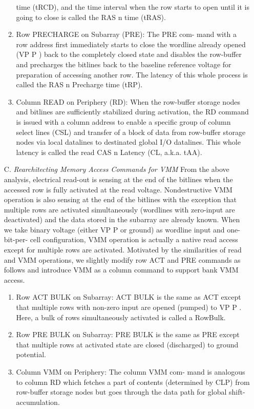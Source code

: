 \documentclass{article}
\begin{document}
\begin{itemize}
\begin{enumerate}
 					time (tRCD), and the time interval when the row starts to open
 					until it is going to close is called the RAS n time (tRAS).
 					\item Row PRECHARGE on Subarray (PRE): The PRE com-
 					mand with a row address first immediately starts to close
 					the wordline already opened (VP P ) back to the completely
 					closed state and disables the row-buffer and precharges the
 					bitlines back to the baseline reference voltage for preparation
 					of accessing another row. The latency of this whole process
 					is called the RAS n Precharge time (tRP).
 					\item Column READ on Periphery (RD): When the row-buffer
 					storage nodes and bitlines are sufficiently stabilized during
 					activation, the RD command is issued with a column address
 					to enable a specific group of column select lines (CSL) and
 					transfer of a block of data from row-buffer storage nodes via
 					local datalines to destinated global I/O datalines. This whole
 					latency is called the read CAS n Latency (CL, a.k.a. tAA).
 				\end{enumerate}
 			
 			\item [C.] \textit{Rearchitecting Memory Access Commands for VMM}
 				From the above analysis, electrical read-out is sensing
 				at the end of the bitlines when the accessed row is fully
 				activated at the read voltage. Nondestructive VMM operation
 				is also sensing at the end of the bitlines with the exception
 				that multiple rows are activated simultaneously (wordlines
 				with zero-input are deactivated) and the data stored in the
 				subarray are already known. When we take binary voltage
 				(either VP P or ground) as wordline input and one-bit-per-
 				cell configuration, VMM operation is actually a native read
 				access except for multiple rows are activated. Motivated by the
 				similarities of read and VMM operations, we slightly modify
 				row ACT and PRE commands as follows and introduce VMM
 				as a column command to support bank VMM access.
 				\begin{enumerate}
 					\item Row ACT BULK on Subarray: ACT BULK is the same
 					as ACT except that multiple rows with non-zero input are
 					opened (pumped) to VP P . Here, a bulk of rows simultaneously
 					activated is called a RowBulk.
 					\item Row PRE BULK on Subarray: PRE BULK is the same
 					as PRE except that multiple rows at activated state are closed
 					(discharged) to ground potential.
 					\item Column VMM on Periphery: The column VMM com-
 					mand is analogous to column RD which fetches a part of
 					contents (determined by CLP) from row-buffer storage nodes
 					but goes through the data path for global shift-accumulation.
 				\end{enumerate}
 			
 		\end{itemize}
 			
\end{document}
